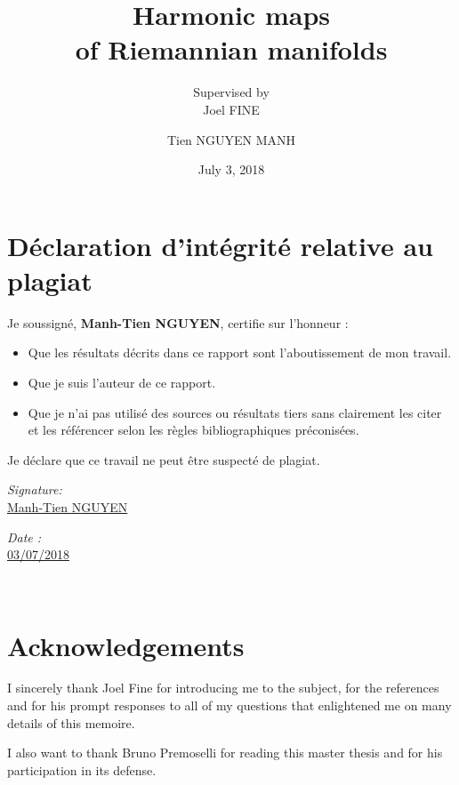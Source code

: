 \documentclass[12pt]{book}
\author{Tien NGUYEN MANH}
\date{July 3, 2018}
\title{Harmonic maps\\ of Riemannian manifolds}
\subtitle{Supervised by \\Joel FINE}
\begin{document}
\maketitle

\section*{Déclaration d’intégrité relative au plagiat}
\label{sec:declaration}
Je soussigné, \textbf{Manh-Tien NGUYEN}, certifie sur l'honneur :

\begin{itemize} 
\item Que les résultats décrits dans ce rapport sont l’aboutissement de mon travail.
\item Que je suis l’auteur de ce rapport.

\item   Que je n’ai pas utilisé des sources ou résultats tiers sans clairement les citer et les référencer selon les règles bibliographiques préconisées.

\end{itemize}
 Je déclare que ce travail ne peut être suspecté de plagiat.

 \vspace{2cm}

\begin{minipage}{0.5\textwidth}
\begin{flushleft}
\emph{Signature:}\\
\href{}{Manh-Tien NGUYEN} 
\end{flushleft}
\end{minipage}
\begin{minipage}{0.5\textwidth}
\begin{flushright}
\emph{Date :} \\
\href{}{03/07/2018} 
\end{flushright}
\end{minipage}\\[3cm]


\newpage

\section*{Acknowledgements}

I sincerely thank Joel Fine for introducing me to the subject, for the references and for his prompt responses to
all of my questions that enlightened me on many details of this memoire.

I also want to thank Bruno Premoselli for reading this master thesis and for his
participation in its defense.
\end{document}
